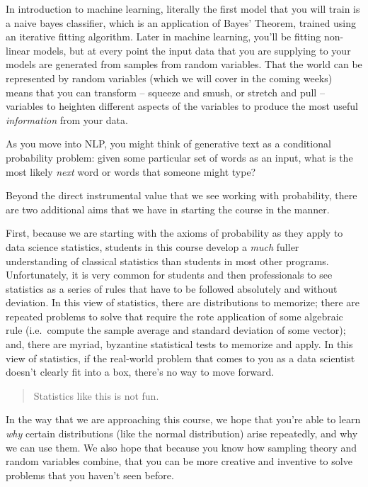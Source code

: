 \documentclass[
]{book}
\theoremstyle{definition}
\theoremstyle{definition}
\theoremstyle{definition}
\theoremstyle{definition}
\theoremstyle{remark}
\begin{document}
In introduction to machine learning, literally the first model that you will train is a naive bayes classifier, which is an application of Bayes' Theorem, trained using an iterative fitting algorithm. Later in machine learning, you'll be fitting non-linear models, but at every point the input data that you are supplying to your models are generated from samples from random variables. That the world can be represented by random variables (which we will cover in the coming weeks) means that you can transform -- squeeze and smush, or stretch and pull -- variables to heighten different aspects of the variables to produce the most useful \emph{information} from your data.

As you move into NLP, you might think of generative text as a conditional probability problem: given some particular set of words as an input, what is the most likely \emph{next} word or words that someone might type?

Beyond the direct instrumental value that we see working with probability, there are two additional aims that we have in starting the course in the manner.

First, because we are starting with the axioms of probability as they apply to data science statistics, students in this course develop a \emph{much} fuller understanding of classical statistics than students in most other programs. Unfortunately, it is very common for students and then professionals to see statistics as a series of rules that have to be followed absolutely and without deviation. In this view of statistics, there are distributions to memorize; there are repeated problems to solve that require the rote application of some algebraic rule (i.e.~compute the sample average and standard deviation of some vector); and, there are myriad, byzantine statistical tests to memorize and apply. In this view of statistics, if the real-world problem that comes to you as a data scientist doesn't clearly fit into a box, there's no way to move forward.

\begin{quote}
Statistics like this is not fun.
\end{quote}

In the way that we are approaching this course, we hope that you're able to learn \emph{why} certain distributions (like the normal distribution) arise repeatedly, and why we can use them. We also hope that because you know how sampling theory and random variables combine, that you can be more creative and inventive to solve problems that you haven't seen before.
\end{document}
